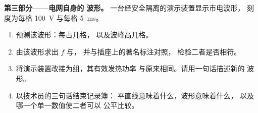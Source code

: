 \begin{problem}
\medskip\noindent\textbf{第三部分——电网自身的
波形。}
一台经安全隔离的演示装置显示市电波形，
刻度为每格 \qty{100}{V} 与每格 \qty{5}{ms}。
\begin{enumerate}[resume]
  \item 预测该波形：每占几格，
        以及波峰高几格。
  \item 由该波形求出 $f$ 与，
        并与插座上的著名标注对照，
        检验二者是否相符。
  \item 将演示装置改接为组，其有效发热功率
        与原来相同。请用一句话描述新的
        波形。
  \item 以技术员的三句话结束记录簿：
        平直线意味着什么，波形意味着什么，
        以及哪一个单一数值使二者可以
        公平比较。
\end{enumerate}
\end{problem}
